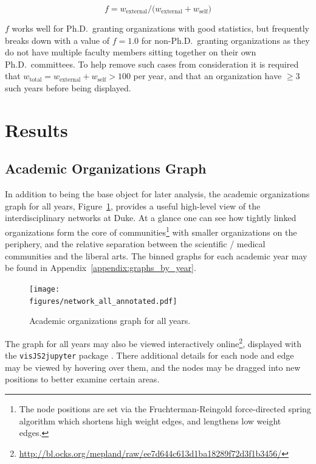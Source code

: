 \documentclass[notitlepage,aps,prd,nofootinbib]{revtex4-1}
\newcommand{\figures}{../outputs/plots}
\begin{document}
\begin{equation} \label{eq:intdisfrac}
f = w_{\text{external}} / \big(w_{\text{external}} + w_{\text{self}}\big)
\end{equation}

$f$ works well for Ph.D.\ granting organizations with good statistics, but frequently breaks down with a value of $f=1.0$ for non-Ph.D.\ granting organizations as they do not have multiple faculty members sitting together on their own Ph.D.\ committees. To help remove such cases from consideration it is required that $w_{\text{total}} = w_{\text{external}} + w_{\text{self}} > 100$ per year, and that an organization have $\geq 3$ such years before being displayed.


\section{Results}
\subsection{Academic Organizations Graph}

In addition to being the base object for later analysis, the academic organizations graph for all years, Figure~\ref{fig:graph_all_years}, provides a useful high-level view of the interdisciplinary networks at Duke. At a glance one can see how tightly linked organizations form the core of communities\footnote{The node positions are set via the Fruchterman-Reingold force-directed spring algorithm which shortens high weight edges, and lengthens low weight edges.} with smaller organizations on the periphery, and the relative separation between the scientific / medical communities and the liberal arts. The binned graphs for each academic year may be found in Appendix~\ref{appendix:graphs_by_year}.

\begin{figure}[!htb]\centering
  \texttt{[image: \\figures/network\_all\_annotated.pdf]}
  \caption{Academic organizations graph for all years.}
  \label{fig:graph_all_years}
\end{figure}

The graph for all years may also be viewed interactively online\footnote{\url{http://bl.ocks.org/mepland/raw/ee7d644c613d1ba18289f72d3f1b3456/}}, displayed with the \texttt{visJS2jupyter} package \cite{visJS2jupyter}. There additional details for each node and edge may be viewed by hovering over them, and the nodes may be dragged into new positions to better examine certain areas.
\end{document}

